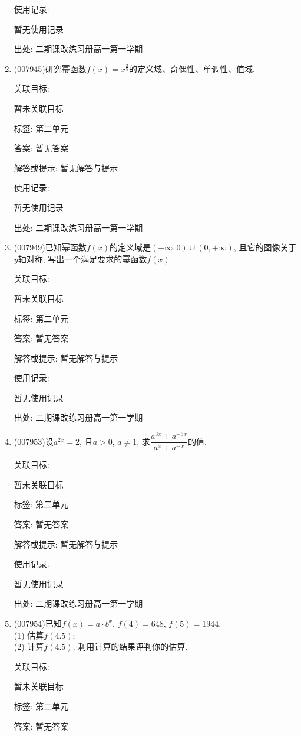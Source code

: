 \documentclass[10pt,a4paper]{article}
\begin{document}
\begin{enumerate}[1.]
使用记录:

暂无使用记录


出处: 二期课改练习册高一第一学期
\item { (007945)}研究幂函数$f(x)=x^{\frac 25}$的定义域、奇偶性、单调性、值域.


关联目标:

暂未关联目标



标签: 第二单元

答案: 暂无答案

解答或提示: 暂无解答与提示

使用记录:

暂无使用记录


出处: 二期课改练习册高一第一学期
\item { (007949)}已知幂函数$f(x)$的定义域是$(+\infty ,0)\cup (0,+\infty)$, 且它的图像关于$y$轴对称, 写出一个满足要求的幂函数$f(x)$.


关联目标:

暂未关联目标



标签: 第二单元

答案: 暂无答案

解答或提示: 暂无解答与提示

使用记录:

暂无使用记录


出处: 二期课改练习册高一第一学期
\item { (007953)}设$a^{2x}=2$, 且$a>0$, $a\ne 1$, 求$\dfrac{a^{3x}+a^{-3x}}{a^x+a^{-x}}$的值.


关联目标:

暂未关联目标



标签: 第二单元

答案: 暂无答案

解答或提示: 暂无解答与提示

使用记录:

暂无使用记录


出处: 二期课改练习册高一第一学期
\item { (007954)}已知$f(x)=a\cdot b^x$, $f(4)=648$, $f(5)=1944$.\\
(1) 估算$f(4.5)$;\\
(2) 计算$f(4.5)$, 利用计算的结果评判你的估算.


关联目标:

暂未关联目标



标签: 第二单元

答案: 暂无答案


\end{enumerate}
\end{document}
